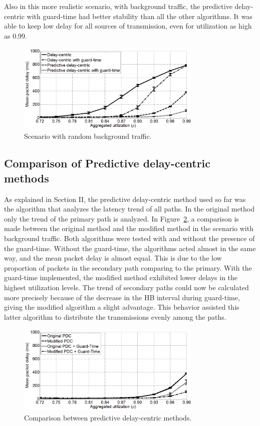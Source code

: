 \documentclass[letterpaper,10pt,oneside,conference,final]{sbrt2015}
\begin{document}
Also in this more realistic scenario, with background traffic, the predictive delay-centric with guard-time had better stability than all the other algorithms. It was able to keep low delay for all sources of transmission, even for utilization as high as 0.99.


\begin{figure}[h!]
\centering
\includegraphics[width=8.8cm,height=4.3cm]{figura6}
\caption{Scenario with random background traffic.}
\label{figura6}
\end{figure}

\subsection{Comparison of Predictive delay-centric methods}
As explained in Section II, the predictive delay-centric method used so far was the algorithm that analyzes the latency trend of all paths. In the original method only the trend of the primary path is analyzed. In Figure~\ref{figura7}, a comparison is made between the original method and the modified method in the scenario with background traffic. Both algorithms were tested with and without the presence of the guard-time.
Without the guard-time, the algorithms acted almost in the same way, and the mean packet delay is almost equal. This is due to the low proportion of packets in the secondary path comparing to the primary. With the guard-time implemented, the modified method exhibited lower delays in the highest utilization levels. The trend of secondary paths could now be calculated more precisely because of the decrease in the HB interval during guard-time, giving the modified algorithm a slight advantage. This behavior assisted this latter algorithm to distribute the transmissions evenly among the paths.

\begin{figure}[h!]
	\centering
	\includegraphics[width=8.8cm,height=4.3cm]{figura7}
	\caption{Comparison between predictive delay-centric methods.}
	\label{figura7}
\end{figure}
\end{document}

